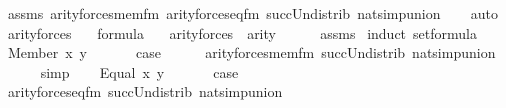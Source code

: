 \begin{isabellebody}
\ assms\ arity{\isacharunderscore}{\kern0pt}forces{\isacharunderscore}{\kern0pt}mem{\isacharunderscore}{\kern0pt}fm\ arity{\isacharunderscore}{\kern0pt}forces{\isacharunderscore}{\kern0pt}eq{\isacharunderscore}{\kern0pt}fm\ succ{\isacharunderscore}{\kern0pt}Un{\isacharunderscore}{\kern0pt}distrib\ nat{\isacharunderscore}{\kern0pt}simp{\isacharunderscore}{\kern0pt}union\isanewline
\ \ \isamarkupfalse%
\ auto%
\endisatagproof
{\isafoldproof}%
%
\isadelimproof
\isanewline
%
\endisadelimproof
\isanewline
{}\isamarkupfalse%
\ arity{\isacharunderscore}{\kern0pt}forces{\isacharprime}{\kern0pt}{\isacharcolon}{\kern0pt}\isanewline
\ \ \ {\isachardoublequoteopen}{\isasymphi}{\isasymin}formula{\isachardoublequoteclose}\isanewline
\ \ \ {\isachardoublequoteopen}arity{\isacharparenleft}{\kern0pt}forces{\isacharprime}{\kern0pt}{\isacharparenleft}{\kern0pt}{\isasymphi}{\isacharparenright}{\kern0pt}{\isacharparenright}{\kern0pt}\ {\isasymle}\ arity{\isacharparenleft}{\kern0pt}{\isasymphi}{\isacharparenright}{\kern0pt}\ {\isacharhash}{\kern0pt}{\isacharplus}{\kern0pt}\ {}{\isachardoublequoteclose}\isanewline
%
\isadelimproof
\ \ %
\endisadelimproof
%
\isatagproof
{}\isamarkupfalse%
\ assms\isanewline
{}\isamarkupfalse%
\ {\isacharparenleft}{\kern0pt}induct\ set{\isacharcolon}{\kern0pt}formula{\isacharparenright}{\kern0pt}\isanewline
\ \ \isamarkupfalse%
\ {\isacharparenleft}{\kern0pt}Member\ x\ y{\isacharparenright}{\kern0pt}\isanewline
\ \ \isamarkupfalse%
\isanewline
\ \ \isamarkupfalse%
\ {\isacharquery}{\kern0pt}case\isanewline
\ \ \ \ \isamarkupfalse%
\ arity{\isacharunderscore}{\kern0pt}forces{\isacharunderscore}{\kern0pt}mem{\isacharunderscore}{\kern0pt}fm\ succ{\isacharunderscore}{\kern0pt}Un{\isacharunderscore}{\kern0pt}distrib\ nat{\isacharunderscore}{\kern0pt}simp{\isacharunderscore}{\kern0pt}union\isanewline
\ \ \ \ \isamarkupfalse%
\ simp\isanewline
{}\isamarkupfalse%
\isanewline
\ \ \isamarkupfalse%
\ {\isacharparenleft}{\kern0pt}Equal\ x\ y{\isacharparenright}{\kern0pt}\isanewline
\ \ \isamarkupfalse%
\isanewline
\ \ \isamarkupfalse%
\ {\isacharquery}{\kern0pt}case\isanewline
\ \ \ \ \isamarkupfalse%
\ arity{\isacharunderscore}{\kern0pt}forces{\isacharunderscore}{\kern0pt}eq{\isacharunderscore}{\kern0pt}fm\ succ{\isacharunderscore}{\kern0pt}Un{\isacharunderscore}{\kern0pt}distrib\ nat{\isacharunderscore}{\kern0pt}simp{\isacharunderscore}{\kern0pt}union\isanewline

\end{isabellebody}
